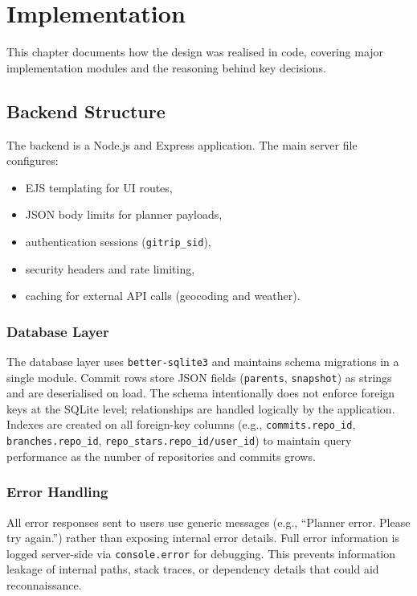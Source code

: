 \chapter{Implementation}
\label{ch:implementation}

This chapter documents how the design was realised in code, covering major
implementation modules and the reasoning behind key decisions.

\section{Backend Structure}
The backend is a Node.js and Express application.
The main server file configures:
\begin{itemize}
  \item EJS templating for UI routes,
  \item JSON body limits for planner payloads,
  \item authentication sessions (\texttt{gitrip\_sid}),
  \item security headers and rate limiting,
  \item caching for external API calls (geocoding and weather).
\end{itemize}

\subsection{Database Layer}
The database layer uses \texttt{better-sqlite3} and maintains schema migrations
in a single module. Commit rows store JSON fields (\texttt{parents},
\texttt{snapshot}) as strings and are deserialised on load. The schema
intentionally does not enforce foreign keys at the SQLite level; relationships
are handled logically by the application. Indexes are created on all
foreign-key columns (e.g., \texttt{commits.repo\_id},
\texttt{branches.repo\_id}, \texttt{repo\_stars.repo\_id/user\_id}) to
maintain query performance as the number of repositories and commits grows.

\subsection{Error Handling}
All error responses sent to users use generic messages (e.g., ``Planner error.
Please try again.'') rather than exposing internal error details. Full error
information is logged server-side via \texttt{console.error} for debugging.
This prevents information leakage of internal paths, stack traces, or
dependency details that could aid reconnaissance.

